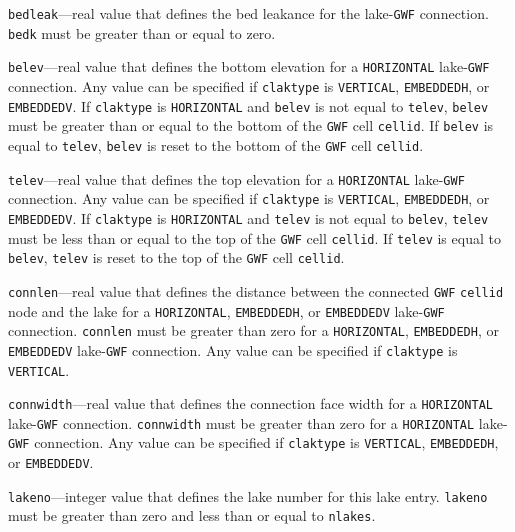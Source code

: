 \item \texttt{bedleak}---real value that defines the bed leakance for the lake-\texttt{GWF} connection. \texttt{bedk} must be greater than or equal to zero.

\item \texttt{belev}---real value that defines the bottom elevation for a \texttt{HORIZONTAL} lake-\texttt{GWF} connection. Any value can be specified if \texttt{claktype} is \texttt{VERTICAL}, \texttt{EMBEDDEDH}, or \texttt{EMBEDDEDV}. If \texttt{claktype} is \texttt{HORIZONTAL} and \texttt{belev} is not equal to \texttt{telev}, \texttt{belev} must be greater than or equal to the bottom of the \texttt{GWF} cell \texttt{cellid}. If \texttt{belev} is equal to \texttt{telev}, \texttt{belev} is reset to the bottom of the \texttt{GWF} cell \texttt{cellid}.

\item \texttt{telev}---real value that defines the top elevation for a \texttt{HORIZONTAL} lake-\texttt{GWF} connection. Any value can be specified if \texttt{claktype} is \texttt{VERTICAL}, \texttt{EMBEDDEDH}, or \texttt{EMBEDDEDV}. If \texttt{claktype} is \texttt{HORIZONTAL} and \texttt{telev} is not equal to \texttt{belev}, \texttt{telev} must be less than or equal to the top of the \texttt{GWF} cell \texttt{cellid}. If \texttt{telev} is equal to \texttt{belev}, \texttt{telev} is reset to the top of the \texttt{GWF} cell \texttt{cellid}.

\item \texttt{connlen}---real value that defines the distance between the connected \texttt{GWF} \texttt{cellid} node and the lake for a \texttt{HORIZONTAL}, \texttt{EMBEDDEDH}, or \texttt{EMBEDDEDV} lake-\texttt{GWF} connection. \texttt{connlen} must be greater than zero for a \texttt{HORIZONTAL}, \texttt{EMBEDDEDH}, or \texttt{EMBEDDEDV} lake-\texttt{GWF} connection. Any value can be specified if \texttt{claktype} is \texttt{VERTICAL}.

\item \texttt{connwidth}---real value that defines the connection face width for a \texttt{HORIZONTAL} lake-\texttt{GWF} connection. \texttt{connwidth} must be greater than zero for a \texttt{HORIZONTAL} lake-\texttt{GWF} connection. Any value can be specified if \texttt{claktype} is \texttt{VERTICAL}, \texttt{EMBEDDEDH}, or \texttt{EMBEDDEDV}.

\item \texttt{lakeno}---integer value that defines the lake number for this lake entry. \texttt{lakeno} must be greater than zero and less than or equal to \texttt{nlakes}.


